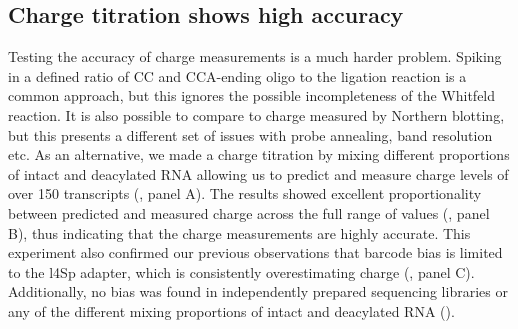 \documentclass[9pt,lineno]{elife}
\begin{document}
\begin{figure}[ht!]
\label{figsupp:f4S2}
\end{figure}






\subsection{Charge titration shows high accuracy}
Testing the accuracy of charge measurements is a much harder problem.
Spiking in a defined ratio of CC and CCA-ending oligo to the ligation reaction is a common approach, but this ignores the possible incompleteness of the Whitfeld reaction.
It is also possible to compare to charge measured by Northern blotting, but this presents a different set of issues with probe annealing, band resolution etc.
As an alternative, we made a charge titration by mixing different proportions of intact and deacylated RNA allowing us to predict and measure charge levels of over 150 transcripts (, panel A).
The results showed excellent proportionality between predicted and measured charge across the full range of values (, panel B), thus indicating that the charge measurements are highly accurate.
This experiment also confirmed our previous observations that barcode bias is limited to the l4Sp adapter, which is consistently overestimating charge (, panel C).
Additionally, no bias was found in independently prepared sequencing libraries or any of the different mixing proportions of intact and deacylated RNA ().
\end{document}
